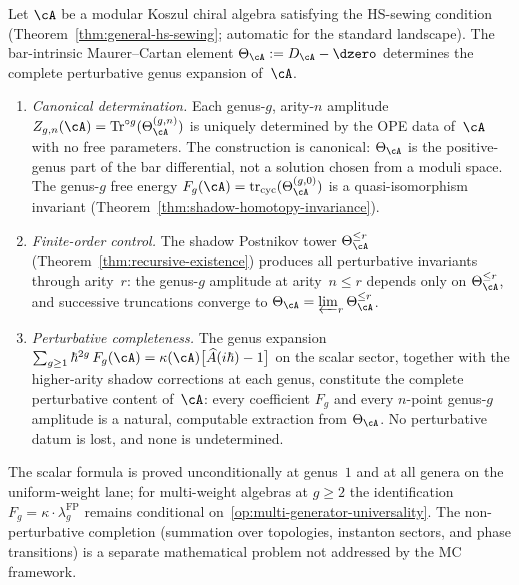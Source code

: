 \begin{theorem}
\label{thm:perturbative-exactness}
Let\/ $\cA$ be a modular Koszul chiral algebra satisfying the
HS-sewing condition
\textup{(}Theorem~\textup{\ref{thm:general-hs-sewing}};
automatic for the standard landscape\textup{)}.
The bar-intrinsic Maurer--Cartan element
$\Theta_\cA := D_\cA - \dzero$
determines the complete perturbative genus expansion of\/~$\cA$.
\begin{enumerate}[label=\textup{(\roman*)}]
\item \emph{Canonical determination.}
  Each genus-$g$, arity-$n$ amplitude
  $Z_{g,n}(\cA) =
  \operatorname{Tr}^{\circ g}(\Theta_\cA^{(g,n)})$
  is uniquely determined by the OPE data of\/~$\cA$
  with no free parameters.  The construction is canonical:
  $\Theta_\cA$ is the positive-genus part of the bar
  differential, not a solution chosen from a moduli space.
  The genus-$g$ free energy
  $F_g(\cA) = \operatorname{tr}_{\mathrm{cyc}}(\Theta_\cA^{(g,0)})$
  is a quasi-isomorphism invariant
  \textup{(}Theorem~\textup{\ref{thm:shadow-homotopy-invariance})}.

\item \emph{Finite-order control.}
  The shadow Postnikov tower
  $\Theta_\cA^{\leq r}$
  \textup{(}Theorem~\textup{\ref{thm:recursive-existence})}
  produces all perturbative invariants through arity~$r$:
  the genus-$g$ amplitude at arity~$n \leq r$ depends only on
  $\Theta_\cA^{\leq r}$, and successive truncations converge
  to $\Theta_\cA = \varprojlim_r \Theta_\cA^{\leq r}$.

\item \emph{Perturbative completeness.}
  The genus expansion
  $\sum_{g \geq 1} \hbar^{2g}\, F_g(\cA)
  = \kappa(\cA)\bigl[\widehat{A}(i\hbar) - 1\bigr]$
  on the scalar sector, together with the higher-arity
  shadow corrections at each genus, constitute the complete
  perturbative content of\/~$\cA$: every coefficient $F_g$
  and every $n$-point genus-$g$ amplitude is a
  natural, computable extraction from $\Theta_\cA$.
  No perturbative datum is lost, and none is undetermined.
\end{enumerate}
The scalar formula is
proved unconditionally at genus~$1$ and at all genera on the
uniform-weight lane; for multi-weight algebras at $g \geq 2$ the
identification
$F_g = \kappa\cdot\lambda_g^{\mathrm{FP}}$ remains conditional
on~\textup{\ref{op:multi-generator-universality}}.
The non-perturbative completion (summation over topologies,
instanton sectors, and phase transitions) is a separate
mathematical problem not addressed by the MC framework.
\end{theorem}

